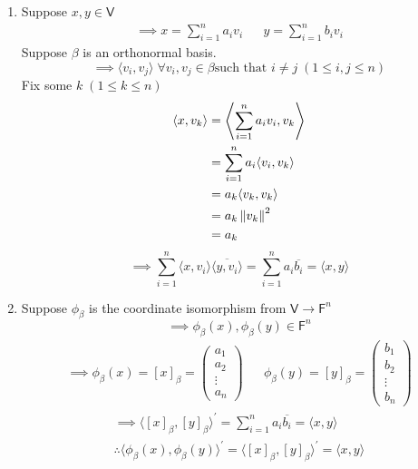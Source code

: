 \begin{enumerate}
\item Suppose $x,y \in \mathsf{V}$
\begin{align}
\implies x = \sum\limits_{i=1}^n a_iv_i & & y = \sum\limits_{i=1}^n b_iv_i
\end{align}
Suppose $\beta$ is an orthonormal basis.
\begin{equation}
\implies \langle v_i,v_j \rangle\; \forall v_i,v_j \in \beta \text{
  such that } i\neq j \; (1\leq i,j \leq n)
\end{equation}
Fix some $k \; (1 \leq k \leq n)$
\begin{align}
\langle x,v_k \rangle &= \left \langle \sum\limits_{i=1}^n
  a_iv_i,v_k\right\rangle \\
&= \sum\limits_{i=1}^n a_i \langle v_i,v_k \rangle\\
&= a_k \langle v_k, v_k \rangle\\
&= a_k \left\lVert v_k\right\rVert^2\\
&= a_k
\end{align}
\begin{equation}
\implies \sum\limits_{i=1}^n \langle x,v_i \rangle \overline{\langle
  y,v_i\rangle} = \sum\limits_{i=1}^n a_i\overline{b_i} = \langle x,y\rangle
\end{equation}
\item Suppose $\phi_\beta$ is the coordinate isomorphism from
  $\mathsf{V} \to \mathsf{F}^n$
\begin{equation}
\implies \phi_\beta(x),\phi_\beta(y) \in \mathsf{F}^n
\end{equation}
\begin{align}
\implies \phi_\beta(x) = [x]_\beta
= \begin{pmatrix}a_1\\a_2\\\vdots\\a_n\end{pmatrix} & & \phi_\beta(y)
= [y]_\beta = \begin{pmatrix}b_1\\b_2\\\vdots\\b_n\end{pmatrix}
\end{align}
\begin{gather}
\implies \langle [x]_\beta,[y]_\beta\rangle^\prime =
\sum\limits_{i=1}^n a_i\overline{b_i} = \langle x,y \rangle\\
\therefore \langle \phi_\beta(x) , \phi_\beta(y) \rangle^\prime =
\langle [x]_\beta, [y]_\beta \rangle^\prime = \langle x,y\rangle
\end{gather}
\end{enumerate}
